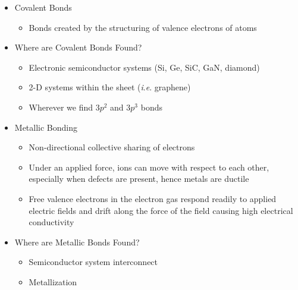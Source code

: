 \begin{itemize}

  \item Covalent Bonds

    \begin{itemize}

      \item Bonds created by the structuring of valence electrons of atoms

    \end{itemize}

  \item Where are Covalent Bonds Found?

    \begin{itemize}

      \item Electronic semiconductor systems (Si, Ge, SiC, GaN, diamond)

      \item 2-D systems within the sheet (\textit{i}.\textit{e}. graphene)

      \item Wherever we find $3p^2$ and $3p^3$ bonds

    \end{itemize}

  \item Metallic Bonding

    \begin{itemize}

      \item Non-directional collective sharing of electrons

      \item Under an applied force, ions can move with respect to each other, especially when defects are present, hence metals are ductile

      \item Free valence electrons in the electron gas respond readily to applied electric fields and drift along the force of the field causing high electrical conductivity

    \end{itemize}

  \item Where are Metallic Bonds Found?

    \begin{itemize}

      \item Semiconductor system interconnect

      \item Metallization


\end{itemize}
\end{itemize}
